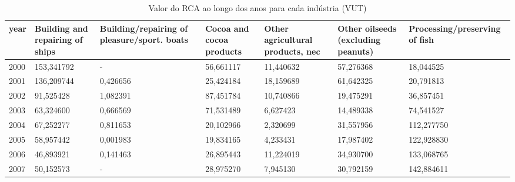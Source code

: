 \begin{table}
\centering
\caption{Valor do RCA ao longo dos anos para cada indústria (VUT)}
\begin{tabular}{p{1cm}p{2cm}p{2cm}p{2cm}p{2cm}p{2cm}p{2cm}}
\toprule
 year &  Building and repairing of ships &  Building/repairing of pleasure/sport. boats &  Cocoa and cocoa products &  Other agricultural products, nec &  Other oilseeds (excluding peanuts) &  Processing/preserving of fish \\
\midrule
 2000 &                       153,341792 &                                            - &                 56,661117 &                         11,440632 &                           57,276368 &                      18,044525 \\
 2001 &                       136,209744 &                                     0,426656 &                 25,424184 &                         18,159689 &                           61,642325 &                      20,791813 \\
 2002 &                        91,525428 &                                     1,082391 &                 87,451784 &                         10,740866 &                           19,475291 &                      36,857451 \\
 2003 &                        63,324600 &                                     0,666569 &                 71,531489 &                          6,627423 &                           14,489338 &                      74,541527 \\
 2004 &                        67,252277 &                                     0,811653 &                 20,102966 &                          2,320699 &                           31,557956 &                     112,277750 \\
 2005 &                        58,957442 &                                     0,001983 &                 19,834165 &                          4,233431 &                           17,987402 &                     122,928830 \\
 2006 &                        46,893921 &                                     0,141463 &                 26,895443 &                         11,224019 &                           34,930700 &                     133,068765 \\
 2007 &                        50,152573 &                                            - &                 28,975270 &                          7,945130 &                           30,792159 &                     142,884611 \\

\end{tabular}
\end{table}
